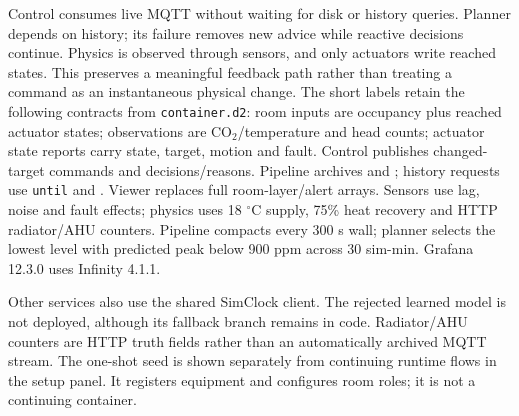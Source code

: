 \documentclass[11pt,a4paper]{article}
\begin{document}
Control consumes live MQTT without waiting for disk or history queries. Planner depends on history; its failure removes new advice while reactive decisions continue. Physics is observed through sensors, and only actuators write reached states. This preserves a meaningful feedback path rather than treating a command as an instantaneous physical change.
The short labels retain the following contracts from \texttt{container.d2}: room inputs are occupancy plus reached actuator states; observations are CO$_2$/temperature and head counts; actuator state reports carry state, target, motion and fault. Control publishes changed-target commands and decisions/reasons. Pipeline archives \protect{} and \protect{}; history requests use \texttt{until} and \protect{}. Viewer replaces full room-layer/alert arrays. Sensors use lag, noise and fault effects; physics uses 18 $^\circ$C supply, 75\% heat recovery and HTTP radiator/AHU counters. Pipeline compacts every 300 s wall; planner selects the lowest level with predicted peak below 900 ppm across 30 sim-min. Grafana 12.3.0 uses Infinity 4.1.1.

Other services also use the shared SimClock client. The rejected learned model is not deployed, although its fallback branch remains in code. Radiator/AHU counters are HTTP truth fields rather than an automatically archived MQTT stream. The one-shot seed is shown separately from continuing runtime flows in the setup panel. It registers equipment and configures room roles; it is not a continuing container.
\end{document}
